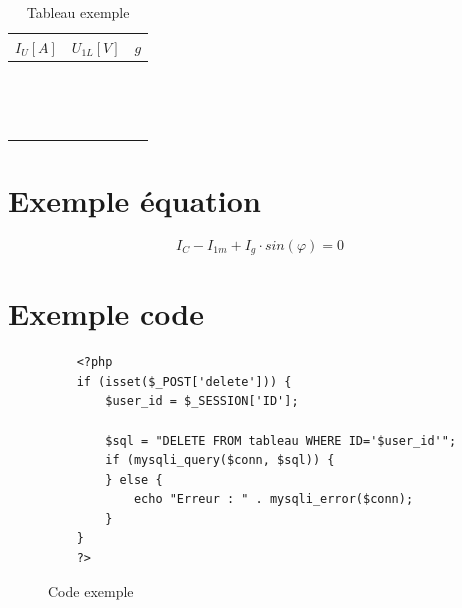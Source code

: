 \documentclass[a4paper,12pt,oneside]{report}	%
\begin{document}
\begin{table}[H]
    \centering
    \begin{tabular}{c|c|c}
    $I_{U}[A]$ & $U_{1L} [V]$ & $g$ \\ \hline
       &   &   \\
       &   &   \\
       &   &   \\
       &   &   \\
       &   &   \\
       &   &   \\
       &   &   \\
       &   &   \\
       &   &   \\
       &   &   \\
       &   &   \\
       &   &   \\
       &   &   \\
       &   &   \\
       &   &   \\
    \end{tabular}
    \caption{Tableau exemple}
    \label{tab exemple}
\end{table}

\section{Exemple équation}

\begin{equation}
    I_C-I_{1m}+I_g\cdot sin(\varphi)=0
    \label{éq exemple}
\end{equation}

\section{Exemple code}

\begin{figure}[H]
    \centering
    \begin{verbatim}
    <?php
    if (isset($_POST['delete'])) {
        $user_id = $_SESSION['ID'];

        $sql = "DELETE FROM tableau WHERE ID='$user_id'";
        if (mysqli_query($conn, $sql)) {
        } else {
            echo "Erreur : " . mysqli_error($conn);
        }
    }
    ?>
    \end{verbatim}
    \caption{Code exemple}
    \label{code exemple}
\end{figure}
\end{document}
